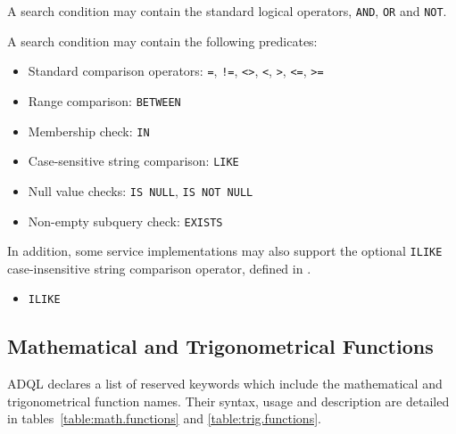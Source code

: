 \documentclass[11pt,a4paper]{ivoa}
\begin{document}
A search condition may contain the standard logical operators, \verb:AND:, \verb:OR: and \verb:NOT:.

A search condition may contain the following predicates:

\begin{itemize}
    \item Standard comparison operators: \verb:=:, \verb:!=:, \verb:<>:, \verb:<:, \verb:>:, \verb:<=:, \verb:>=:
    \item Range comparison: \verb:BETWEEN:
    \item Membership check: \verb:IN:
    \item Case-sensitive string comparison: \verb:LIKE:
    \item Null value checks: \verb:IS NULL:, \verb:IS NOT NULL:
    \item Non-empty subquery check: \verb:EXISTS:
\end{itemize}

In addition, some service implementations may also support the optional \verb:ILIKE:
case-insensitive string comparison operator, defined in .

\begin{itemize}
    \item \verb:ILIKE:
\end{itemize}

\subsection{Mathematical and Trigonometrical Functions}
\label{sec:math.functions}

ADQL declares a list of reserved keywords  which include
the mathematical and trigonometrical function names. Their syntax,
usage and description are detailed in tables~\ref{table:math.functions}
and \ref{table:trig.functions}.
\end{document}
